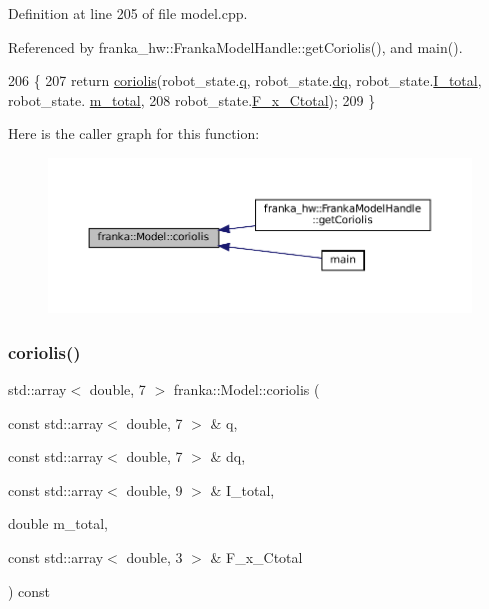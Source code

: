 Definition at line 205 of file model.\+cpp.



Referenced by franka\+\_\+hw\+::\+Franka\+Model\+Handle\+::get\+Coriolis(), and main().


\begin{DoxyCode}
206              \{
207   \textcolor{keywordflow}{return} \hyperlink{classfranka_1_1Model_a9be45a91c3288088dd222f2e55870aa8}{coriolis}(robot\_state.\hyperlink{structfranka_1_1RobotState_ade3335d1ac2f6c44741a916d565f7091}{q}, robot\_state.\hyperlink{structfranka_1_1RobotState_af372a0081d72bc7b4fe873f99c7b2d8c}{dq}, robot\_state.\hyperlink{structfranka_1_1RobotState_ad9120ae7b7613e77df8c1c3eba8fb033}{I\_total}, robot\_state.
      \hyperlink{structfranka_1_1RobotState_a87880d4693c8f576ebdabf00f4d4f981}{m\_total},
208                   robot\_state.\hyperlink{structfranka_1_1RobotState_a72ee7362018e3c9e95e3c41e857bfd8d}{F\_x\_Ctotal});
209 \}
\end{DoxyCode}
Here is the caller graph for this function\+:
\nopagebreak
\begin{figure}[H]
\begin{center}
\leavevmode
\includegraphics[width=350pt]{classfranka_1_1Model_a9be45a91c3288088dd222f2e55870aa8_icgraph}
\end{center}
\end{figure}
\mbox{\label{classfranka_1_1Model_a4f9edd79fba1989a09cda4aeaf811bf2}} 
\subsubsection{\texorpdfstring{coriolis()}{coriolis()}\hspace{0.1cm}{\footnotesize\ttfamily [2/2]}}
{\footnotesize\ttfamily std\+::array$<$ double, 7 $>$ franka\+::\+Model\+::coriolis (\begin{DoxyParamCaption}\item[{const std\+::array$<$ double, 7 $>$ \&}]{q,  }\item[{const std\+::array$<$ double, 7 $>$ \&}]{dq,  }\item[{const std\+::array$<$ double, 9 $>$ \&}]{I\+\_\+total,  }\item[{double}]{m\+\_\+total,  }\item[{const std\+::array$<$ double, 3 $>$ \&}]{F\+\_\+x\+\_\+\+Ctotal }\end{DoxyParamCaption}) const\hspace{0.3cm}{\ttfamily [noexcept]}}

